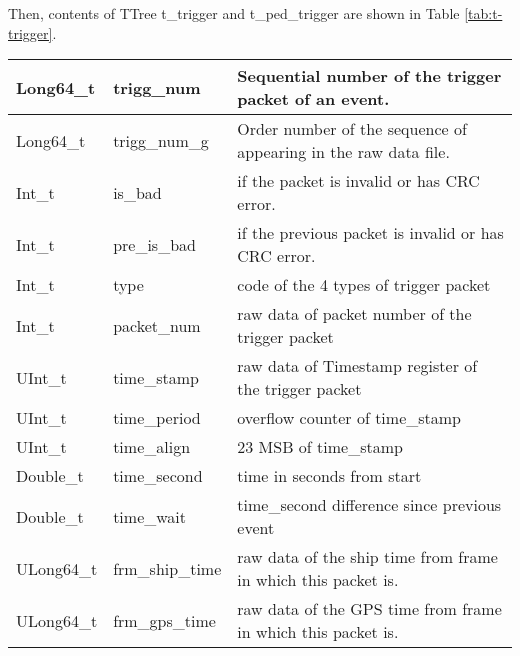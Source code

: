 \documentclass[a4paper, 12pt, onecolumn]{article}
\begin{document}
Then, contents of TTree t\_trigger and t\_ped\_trigger are shown in Table \ref{tab:t-trigger}.

\begin{center}
  \label{tab:t-trigger}    
  \tablelasttail{\hline}
  \begin{supertabular}{| p{28mm} | p{29mm} | p{66mm} |}
    Long64\_t          & trigg\_num           & Sequential number of the trigger packet of an event. \\\hline
    Long64\_t          & trigg\_num\_g        & Order number of the sequence of appearing in the raw data file. \\\hline
    Int\_t             & is\_bad              & if the packet is invalid or has CRC error. \\\hline
    Int\_t             & pre\_is\_bad         & if the previous packet is invalid or has CRC error. \\\hline
    Int\_t             & type                 & code of the 4 types of trigger packet \\\hline
    Int\_t             & packet\_num          & raw data of packet number of the trigger packet \\\hline
    UInt\_t            & time\_stamp          & raw data of Timestamp register of the trigger packet \\\hline
    UInt\_t            & time\_period         & overflow counter of time\_stamp \\\hline
    UInt\_t            & time\_align          & 23 MSB of time\_stamp \\\hline
    Double\_t          & time\_second         & time in seconds from start \\\hline
    Double\_t          & time\_wait           & time\_second difference since previous event \\\hline
    ULong64\_t         & frm\_ship\_time      & raw data of the ship time from frame in which this packet is. \\\hline
    ULong64\_t         & frm\_gps\_time       & raw data of the GPS time from frame in which this packet is. \\\hline

\end{supertabular}
\end{center}
\end{document}
